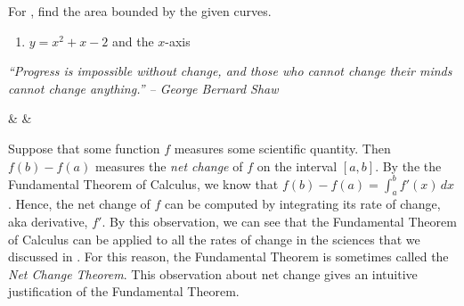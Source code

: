 \documentclass{book}
\newcommand{\dx}{\,dx}
\newcommand{\dint}{\displaystyle \int}
\begin{document}
For , find the area bounded by the given curves.
\begin{enumerate}[!HW!]
\item \label{exer:areaftc:start}\label{exer:areaftc:stop} $y=x^2+x-2$ and the $x$-axis %
\end{enumerate}
\pagebreak

\begin{center} 
\emph{``Progress is impossible without change, and those who cannot change their minds cannot change anything.'' -- George Bernard Shaw}
\end{center}

\begin{Videos}
 &
  &
\end{Videos}


Suppose that some function $f$ measures some scientific quantity. Then $f(b)-f(a)$ measures the \emph{net change} of $f$ on the interval $[a,b]$. By the the Fundamental Theorem of Calculus, we know that $f(b)-f(a) = \dint_a^b f'(x)\dx$. Hence, the net change of $f$ can be computed by integrating its rate of change, aka derivative, $f'$. By this observation, we can see that the Fundamental Theorem of Calculus can be applied to all the rates of change in the sciences that we discussed in . For this reason, the Fundamental Theorem is sometimes called the \emph{Net Change Theorem}. This observation about net change gives an intuitive justification of the Fundamental Theorem.
\end{document}
